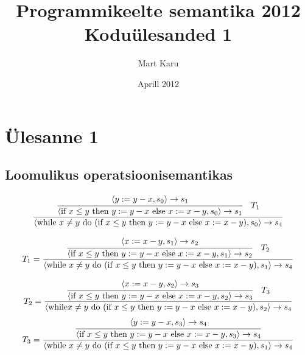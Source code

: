 \documentclass[a4paper,oneside]{article}
\begin{document}
\title{Programmikeelte semantika 2012\\
Koduülesanded 1}
\author{Mart Karu}
\date{Aprill 2012}
\maketitle
\section{Ülesanne 1}
\subsection{Loomulikus operatsioonisemantikas}

\[
  \frac{
    \cfrac{
      \langle y := y-x, s_0 \rangle \rightarrow s_1
    }{
      \langle
        \text{if } x \leq y
          \text{ then } y := y-x
          \text{ else } x := x-y
        , s_0
      \rangle \rightarrow s_1
    }
    \quad
    T_1
  }{
    \langle 
    \text{while } x \neq  y \text{ do }
      (\text{if } x \leq y
        \text{ then } y := y-x
        \text{ else } x := x-y)
      , s_0
    \rangle \rightarrow s_4
  }
\]

\[
  T_1 = \frac{
    \cfrac{
      \langle x := x-y, s_1 \rangle \rightarrow s_2
    }{
      \langle 
        \text{if } x \leq y
          \text{ then } y := y-x
          \text{ else } x:= x-y
        , s_1
      \rangle \rightarrow s_2
    }
    \quad
    T_2
  }{
    \langle 
    \text{while } x \neq y \text{ do }
      (\text{if } x \leq y
        \text{ then } y := y-x
        \text{ else } x:= x-y)
      , s_1
    \rangle \rightarrow s_4
  }
\]

\[
  T_2 = \frac{
    \cfrac{
      \langle x := x-y, s_2 \rangle \rightarrow s_3
    }{
      \langle 
        \text{if } x \leq y
          \text{ then } y := y-x
          \text{ else } x := x-y
        , s_2
      \rangle \rightarrow s_3
    }
    \quad
    T_3
  }{
    \langle 
    \text{while} x \neq  y \text{ do }
      (\text{if } x \leq y
        \text{ then } y := y-x
        \text{ else } x := x-y)
      , s_2
    \rangle \rightarrow s_4
  }
\]
\[
  T_3 = \frac{
    \cfrac{
      \langle y := y-x, s_3 \rangle \rightarrow s_4
    }{
      \langle
        \text{if } x \leq y
          \text{ then } y := y-x
          \text{ else } x := x-y
        , s_3
      \rangle \rightarrow s_4
    }
  }{
    \langle
    \text{while } x \neq y \text{ do }
      (\text{if } x \leq y
        \text{ then } y := y-x
        \text{ else } x := x-y )
      , s_1
    \rangle \rightarrow s_4
  }
\]
\end{document}

